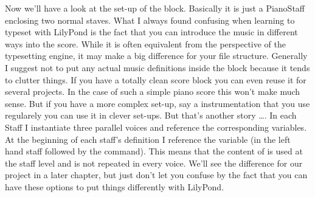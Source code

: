 \documentclass[../../LilyPond-Tutorials]{subfiles}
\begin{document}
Now we'll have a look at the set-up of the  block. 
Basically it is just a PianoStaff enclosing two normal staves. 
What I always found confusing when learning to typeset with LilyPond is the fact that you can introduce the music in different ways into the score. 
While it is often equivalent from the perspective of the typesetting engine, it may make a big difference for your file structure. 
Generally I suggest not to put any actual music definitions inside the  block because it tends to clutter things. 
If you have a totally clean score block you can even reuse it for several projects. 
In the case of such a simple piano score this won't make much sense. 
But if you have a more complex set-up, say a instrumentation that you use regularely you can use it in clever set-ups. 
But that's another story \dots.
In each Staff I instantiate three parallel voices and reference the corresponding variables. 
At the beginning of each staff's definition I reference the  variable (in the left hand staff followed by the  command). 
This means that the content of  is used at the staff level and is not repeated in every voice. 
We'll see the difference for our project in a later chapter, but just don't let you confuse by the fact that you can have these options to put things differently with LilyPond.
\end{document}
